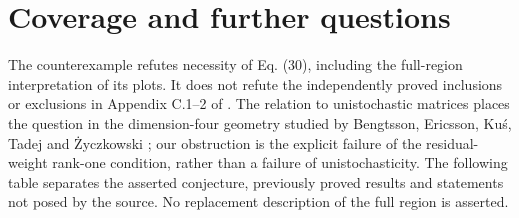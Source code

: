 \documentclass[11pt]{article}
\begin{document}
\section{Coverage and further questions}
The counterexample refutes necessity of Eq. (30), including the full-region
interpretation of its plots. It does not refute the independently proved
inclusions or exclusions in Appendix C.1--2 of \cite{KCPZ}.
The relation to unistochastic matrices places the question in the
dimension-four geometry studied by Bengtsson, Ericsson, Ku\'s, Tadej and
\.Zyczkowski \cite{BEKTZ}; our obstruction is the explicit failure of the
residual-weight rank-one condition, rather than a failure of unistochasticity.
The following table separates the asserted conjecture, previously proved
results and statements not posed by the source. No replacement description
of the full region is asserted.
\end{document}
